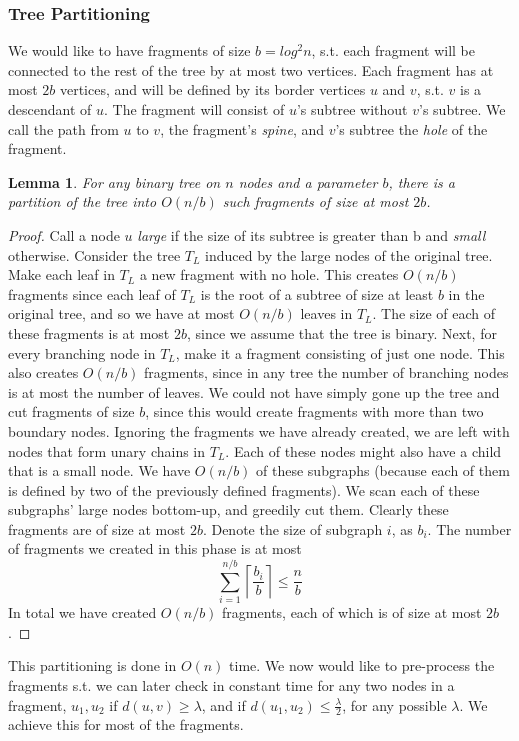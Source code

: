 \documentclass[11pt,a4paper]{article}
\newtheorem{lemma}{Lemma}
\theoremstyle{definition}
\theoremstyle{remark}
\begin{document}
\subsubsection{Tree Partitioning}
We would like to have fragments of size $b=log^2n$, s.t. each fragment will be connected to the rest of the tree by at most two vertices. Each fragment has at most $2b$ vertices, and will be defined by its border vertices $u$ and $v$, s.t. $v$ is a descendant of $u$. The fragment will consist of $u$'s subtree without $v$'s subtree. We call the path from $u$ to $v$, the fragment's \textit{spine}, and $v$'s subtree the \textit{hole} of the fragment. %
\begin{lemma}
For any binary tree on $n$ nodes and a parameter $b$, there is a partition of the tree into $O(n/b)$ such fragments of size at most $2b$.
\end{lemma}
\begin{proof}
Call a node $u$ \textit{large} if the size of its subtree is greater than b and \textit{small}
otherwise. Consider the tree $T_L$ induced by the large nodes of the original tree. Make each leaf in $T_L$ a new fragment with no hole. This creates $O(n/b)$ fragments since each leaf of $T_L$ is the root of a subtree of size at least $b$ in the original tree, and so we have at most $O(n/b)$ leaves in $T_L$. The size of each of these fragments is at most $2b$, since we assume that the tree is binary.
Next, for every branching node in $T_L$, make it a fragment consisting of just one node. This also creates $O(n/b)$ fragments, since in any tree the number of branching nodes is at most the number of leaves. We could not have simply gone up the tree and cut fragments of size $b$, since this would create fragments with more than two boundary nodes.
Ignoring the fragments we have already created, we are left with nodes that form unary chains in $T_L$. Each of these nodes might also have a child that is a small node. We have $O(n/b)$ of these subgraphs (because each of them is defined by two of the previously defined fragments). We scan each of these subgraphs' large nodes bottom-up, and greedily cut them. Clearly these fragments are of size at most $2b$. Denote the size of subgraph $i$, as $b_i$. The number of fragments we created in this phase is at most $$\sum_{i=1}^{n/b} \left\lceil \frac{b_i}{b} \right\rceil \leq \frac{n}{b}$$
In total we have created $O(n/b)$ fragments, each of which is of size at most $2b$.
\end{proof}
This partitioning is done in $O(n)$ time.
We now would like to pre-process the fragments s.t. we can later check in constant time for any two nodes in a fragment, $u_1,u_2$ if $d(u,v)\geq\lambda$, and if $d(u_1,u_2) \leq \frac{\lambda}{2}$, for any possible $\lambda$. We achieve this for most of the fragments.
\end{document}
